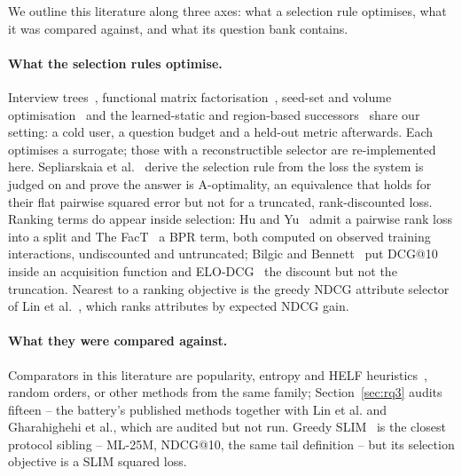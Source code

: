 \documentclass[runningheads]{llncs}
\begin{document}
We outline this literature along three axes: what a selection rule optimises, what it was compared
against, and what its question bank contains.

\paragraph{What the selection rules optimise.}
Interview trees~\cite{golbandi2011adaptive,hu2013interview}, functional matrix
factorisation~\cite{zhou2011functional}, seed-set and volume
optimisation~\cite{liu2011wisdom,anava2015budget} and the learned-static and region-based
successors~\cite{kweon2020deep,nguyen2024pere,parapar2021dpe} share our setting: a cold user, a
question budget and a held-out metric afterwards. Each optimises a surrogate; those with a
reconstructible selector are re-implemented here. Sepliarskaia et al.~\cite{sepliarskaia2018spq}
derive the selection rule from the loss the system is judged on and prove the answer is A-optimality,
an equivalence that holds for their flat pairwise squared error but not for a truncated,
rank-discounted loss. Ranking terms do appear inside selection: Hu and
Yu~\cite{hu2013interview} admit a pairwise rank loss into a split and The
FacT~\cite{tao2019fact,haque2022factcrs} a BPR term, both computed on observed training interactions,
undiscounted and untruncated; Bilgic and Bennett~\cite{bilgic2012activequery} put DCG@10 inside an
acquisition function and ELO-DCG~\cite{long2010elodcg} the discount but not the truncation.
Nearest to a ranking objective is the greedy NDCG attribute selector of Lin et
al.~\cite{lin2023upsrec}, which ranks attributes by expected NDCG gain.

\paragraph{What they were compared against.}
Comparators in this literature are popularity, entropy and HELF
heuristics~\cite{rashid2002getting,rashid2008learning}, random orders, or other methods from the same
family; Section~\ref{sec:rq3} audits fifteen -- the battery's published methods together with Lin et
al. and Gharahighehi et al., which are audited but not run. Greedy SLIM~\cite{proissl2024greedyslim}
is the closest protocol sibling -- ML-25M, NDCG@10, the same tail definition -- but its selection
objective is a SLIM squared loss.
\end{document}
